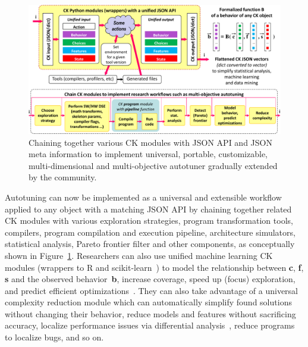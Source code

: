    \begin{figure}[!htbp]
     \centering
      \includegraphics[width=6.6in]
      {ck-assets/9a4de89400e0ff21-cropped.pdf} %
     \caption{
       Chaining together various CK modules with JSON API and JSON meta information
       to implement universal, portable, customizable, multi-dimensional
       and multi-objective autotuner gradually extended by the community.
     }
     \label{fig:ck-universal-autotuning-workflow}
   \end{figure}

Autotuning can now be implemented as a universal and extensible workflow
applied to any object with a matching JSON API by chaining together
related CK modules with various exploration strategies,
program transformation tools, compilers,
program compilation and execution pipeline, architecture simulators,
statistical analysis, Pareto frontier filter and other components,
as conceptually shown in Figure~\ref{fig:ck-universal-autotuning-workflow}.
%
Researchers can also use unified machine learning CK modules
(wrappers to R and scikit-learn~\cite{scikit-learn})
to model the relationship between \textbf{c}, \textbf{f}, \textbf{s}
and the observed behavior~\textbf{b}, increase coverage, speed up (focus) exploration,
and predict efficient optimizations~\cite{fursin:hal-01054763,cm:29db2248aba45e59:cd11e3a188574d80}.
%
They can also take advantage of a universal complexity reduction module
which can automatically simplify found solutions without changing their behavior,
reduce models and features without sacrificing accuracy,
localize performance issues via differential analysis~\cite{FOTP04},
reduce programs to localize bugs, and so on.

